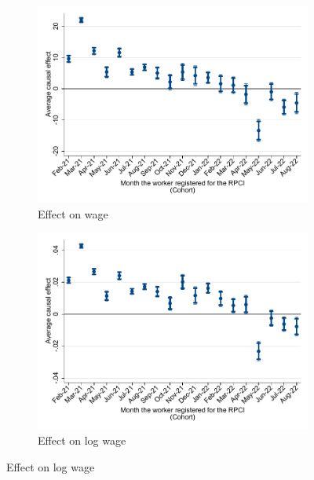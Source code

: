 \documentclass[oneside,11pt]{article}
\begin{document}
\begin{figure}[H]
    \caption{RPCI effect by cohort}
    \label{twfe_beta_cohort}
    \begin{center}
    
    \begin{subfigure}{0.49\textwidth}
    \caption{Effect on wage}
    \includegraphics[width=\textwidth]{04_Figures/muestra_10porciento/twfe_beta_cohort_sal_cierre.pdf}
    \end{subfigure}
    \begin{subfigure}{0.49\textwidth}
    \caption{Effect on log wage}
    \includegraphics[width=\textwidth]{04_Figures/muestra_10porciento/twfe_beta_cohort_log_sal_cierre.pdf}
    \end{subfigure}


\end{center}
\end{figure}
\end{document}
